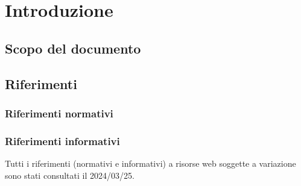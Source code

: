 
\section{Introduzione}

\subsection{Scopo del documento}

\subsection{Riferimenti}
\subsubsection{Riferimenti normativi}



\subsubsection{Riferimenti informativi}



Tutti i riferimenti (normativi e informativi) a risorse web soggette a variazione sono stati consultati il 2024/03/25.
